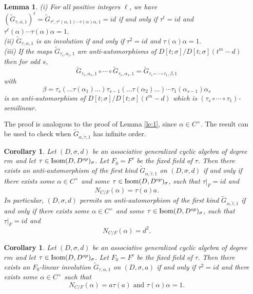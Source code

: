 \documentclass{amsart}
\theoremstyle{plain}
\newtheorem{lemma}[theorem]{Lemma}
\newtheorem{corollary}[theorem]{Corollary}
\theoremstyle{definition}
\numberwithin{equation}{section}
\numberwithin{figure}{section}
\begin{document}
 \begin{lemma}\label{le:general}
(i)
For all positive integers $\ell$, we have $(\widetilde G_{\tau,\alpha,1})^\ell=\widetilde G_{\tau^\ell,\tau^\ell(\alpha,1)\cdots \tau(\alpha)\alpha,1}=id$  if and only if $\tau^\ell=id$ and
 $\tau^\ell(\alpha)\cdots \tau(\alpha)\alpha=1.$
 \\ (ii) $\widetilde G_{\tau,\alpha,1}$ is an involution if and only if $\tau^2=id$ and
 $ \tau(\alpha)\alpha=1.$
 \\ (iii)  If the maps $\widetilde G_{\tau_i,\alpha_i,1}$  are  anti-automorphisms of $D[t;\sigma]/D[t;\sigma](t^m-d)$ 
  then for odd $s$,
 $$\widetilde G_{\tau_s,\alpha_s,1}\circ\cdots \circ  \widetilde G_{\tau_1,\alpha_1,1}=\widetilde G_{\tau_s\circ\cdots \circ \tau_1,\beta,1}$$
 with
 $$\beta=\tau_s(\dots \tau(\alpha_1)\dots ) \tau_{s-1}(\dots \tau(\alpha_2)\dots )\cdots \tau_1(\alpha_{s-1}) \alpha_s$$
 is an anti-automorphism of $D[t;\sigma]/D[t;\sigma](t^m-d)$ 
 which is $(\tau_s\circ\cdots \circ \tau_1)$-semilinear.
  \end{lemma}

The proof is analogous to the proof of Lemma \ref{le:1}, since $\alpha\in C^\times$. The result can be used to check when $\widetilde G_{\alpha,\tilde\tau,1}$  has infinite order.

\begin{corollary}
Let  $(D,\sigma,d)$ be an associative generalized cyclic algebra of degree $rm$ and let $\tau \in {\rm Isom}(D,D^{op})_\sigma$. Let $F_0=F^\tau$ be the fixed field of $\tau$.
Then there exists an  anti-automorphism of the first kind
 $\widetilde G_{\alpha,\tilde\tau,1}$ on $(D,\sigma,d)$
  if and only if there exists  some $\alpha\in C^\times$ and some $\tau\in {\rm Isom}(D,D^{op})_\sigma$,  such that $\tau|_F=id$ and
  $$N_{C/F}(\alpha)= \tau(a)a.$$
  In particular, $(D,\sigma,d)$ permits an  anti-automorphism of the first kind
 $\widetilde G_{\alpha,\tilde\tau,1}$ if and only if there exists  some $\alpha\in C^\times$ and some $\tau\in {\rm Isom}(D,D^{op})_\sigma$,  such that $\tau|_F=id$ and
  $$N_{C/F}(\alpha)= d^2.$$
\end{corollary}


\begin{corollary}\label{cor:inv}
Let  $(D,\sigma,d)$ be an associative generalized cyclic algebra of degree $rm$ and let $\tau \in {\rm Isom}(D,D^{op})_\sigma$. Let $F_0=F^\tau$ be the fixed field of $\tau$.
Then there exists an $F_0$-linear involution $\widetilde G_{\tau,\alpha,1}$ on $(D,\sigma,a)$
 if and only if $\tau^2=id$ and there exists  some $\alpha\in C^\times$ such that
$$N_{C/F}(\alpha)=a\tau(a) \text{ and } \tau(\alpha)\alpha=1.$$
\end{corollary}
\end{document}
